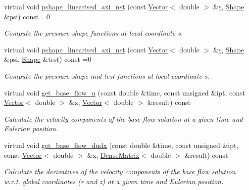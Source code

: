 \begin{DoxyCompactItemize}
virtual void \hyperlink{classoomph_1_1LinearisedAxisymmetricNavierStokesEquations_a86dd84e88a2f10e33f61b1a09c8aefd7}{pshape\+\_\+linearised\+\_\+axi\+\_\+nst} (const \hyperlink{classoomph_1_1Vector}{Vector}$<$ double $>$ \&\hyperlink{cfortran_8h_ab7123126e4885ef647dd9c6e3807a21c}{s}, \hyperlink{classoomph_1_1Shape}{Shape} \&psi) const =0
\begin{DoxyCompactList}\small\item\em Compute the pressure shape functions at local coordinate s. \end{DoxyCompactList}\item 
virtual void \hyperlink{classoomph_1_1LinearisedAxisymmetricNavierStokesEquations_ae2f6cf4a374c45a35ac1bea04ffced1f}{pshape\+\_\+linearised\+\_\+axi\+\_\+nst} (const \hyperlink{classoomph_1_1Vector}{Vector}$<$ double $>$ \&\hyperlink{cfortran_8h_ab7123126e4885ef647dd9c6e3807a21c}{s}, \hyperlink{classoomph_1_1Shape}{Shape} \&psi, \hyperlink{classoomph_1_1Shape}{Shape} \&test) const =0
\begin{DoxyCompactList}\small\item\em Compute the pressure shape and test functions at local coordinate s. \end{DoxyCompactList}\item 
virtual void \hyperlink{classoomph_1_1LinearisedAxisymmetricNavierStokesEquations_a74c8399c96e4870f831dcc01986a72cd}{get\+\_\+base\+\_\+flow\+\_\+u} (const double \&time, const unsigned \&ipt, const \hyperlink{classoomph_1_1Vector}{Vector}$<$ double $>$ \&x, \hyperlink{classoomph_1_1Vector}{Vector}$<$ double $>$ \&result) const
\begin{DoxyCompactList}\small\item\em Calculate the velocity components of the base flow solution at a given time and Eulerian position. \end{DoxyCompactList}\item 
virtual void \hyperlink{classoomph_1_1LinearisedAxisymmetricNavierStokesEquations_aa3924125dde70779c180b84408271422}{get\+\_\+base\+\_\+flow\+\_\+dudx} (const double \&time, const unsigned \&ipt, const \hyperlink{classoomph_1_1Vector}{Vector}$<$ double $>$ \&x, \hyperlink{classoomph_1_1DenseMatrix}{Dense\+Matrix}$<$ double $>$ \&result) const
\begin{DoxyCompactList}\small\item\em Calculate the derivatives of the velocity components of the base flow solution w.\+r.\+t. global coordinates (r and z) at a given time and Eulerian position. \end{DoxyCompactList}\item 

\end{DoxyCompactItemize}
